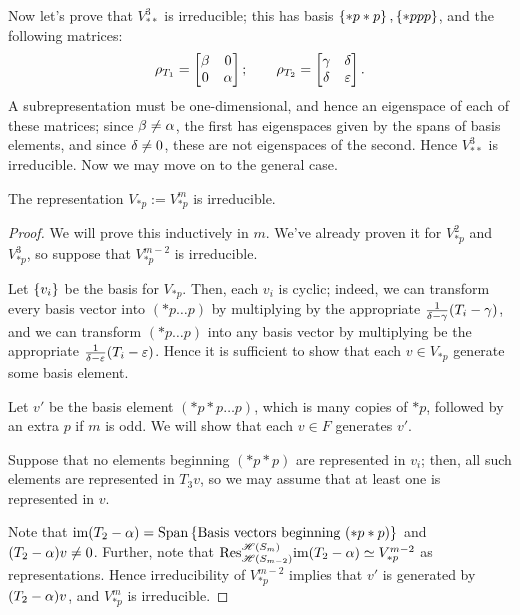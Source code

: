 \documentclass{amsart}
\begin{document}
Now let's prove that $V^3_{**}$ is irreducible;
this has basis $\left\{ *p*p \right\}, \left\{ *ppp \right\}$, and the following matrices:
\[
  \rho_{T_1} = \begin{bmatrix}
    \beta & 0\\
    0 & \alpha
  \end{bmatrix}; \hspace{20pt}
  \rho_{T_2} = \begin{bmatrix}
    \gamma & \delta\\
    \delta & \varepsilon
  \end{bmatrix}.
\]
A subrepresentation must be one-dimensional, and hence an eigenspace of each of these matrices;
since $\beta \neq \alpha$, the first has eigenspaces given by the spans of basis elements, and since $\delta \neq 0$, these are not eigenspaces of the second.
Hence $V^3_{**}$ is irreducible.
Now we may move on to the general case.
\begin{proposition}
  The representation $V_{*p} := V^m_{*p}$ is irreducible.
\end{proposition}
\begin{proof}
  We will prove this inductively in $m$.
  We've already proven it for $V^2_{*p}$ and $V^3_{*p}$, so suppose that $V^{m-2}_{*p}$ is irreducible.
  
  Let $\left\{ v_i \right\}$ be the basis for $V_{*p}$.
  Then, each $v_i$ is cyclic; indeed, we can transform every basis vector into $(*p\dots p)$ by multiplying by the appropriate $\frac{1}{\delta-\gamma}(T_i - \gamma)$, and we can transform $(*p\dots p)$ into any basis vector by multiplying be the appropriate $\frac{1}{\delta-\varepsilon}(T_i - \varepsilon)$.
  Hence it is sufficient to show that each $v \in V_{*p}$ generate some basis element.

  Let $v'$ be the basis element $(*p*p\dots p)$, which is many copies of $*p$, followed by an extra $p$ if $m$ is odd.
  We will show that each $v \in F$ generates $v'$.

  Suppose that no elements beginning $(*p*p)$ are represented in $v_i$;
  then, all such elements are represented in $T_3v$, so we may assume that at least one is represented in $v$.

  Note that $\text{im} (T_2 - \alpha) = \text{Span}\left\{ \text{Basis vectors beginning }(*p*p) \right\}$ and $(T_2 - \alpha)v \neq 0$.
  Further, note that $\text{Res}_{\mathscr{H}(S_{m-2})}^{\mathscr{H}(S_m)} \text{im} (T_2 - \alpha) \simeq V^{m-2}_{*p}$ as representations.
  Hence irreducibility of $V^{m-2}_{*p}$ implies that $v'$ is generated by $(T_2 - \alpha)v$, and $V^m_{*p}$ is irreducible.
\end{proof}
\end{document}
